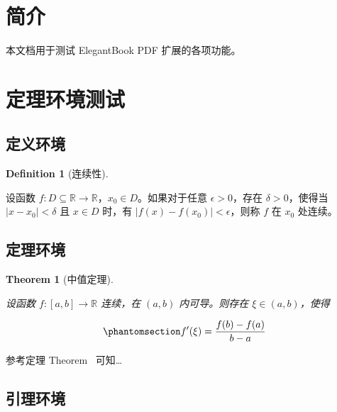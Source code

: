 \documentclass[
  11pt,
  letterpaper,
  oneside,
  a4paper]{book}
\numberwithin{equation}{chapter}
\let\quartoOldRef\ref
\renewcommand{\ref}[1]{%
    \IfBeginWith{#1}{eq-}{%
      \textup{(\quartoOldRef{#1})}%
    }{%
      \quartoOldRef{#1}%
    }%
  }%
\theoremstyle{plain}
\theoremstyle{plain}
\theoremstyle{plain}
\theoremstyle{plain}
\newtheorem{theorem}{Theorem}[chapter]
\theoremstyle{definition}
\newtheorem{definition}{Definition}[chapter]
\theoremstyle{remark}
\begin{document}
\section{简介}\label{ux7b80ux4ecb}

本文档用于测试 ElegantBook PDF 扩展的各项功能。

\section{定理环境测试}\label{ux5b9aux7406ux73afux5883ux6d4bux8bd5}

\subsection{定义环境}\label{ux5b9aux4e49ux73afux5883}

\begin{definition}[连续性]\protect\hypertarget{def-continuous}{}\label{def-continuous}

设函数
\(f: D \subseteq \mathbb{R} \to \mathbb{R}\)，\(x_0 \in D\)。如果对于任意
\(\epsilon > 0\)，存在 \(\delta > 0\)，使得当 \(|x - x_0| < \delta\) 且
\(x \in D\) 时，有 \(|f(x) - f(x_0)| < \epsilon\)，则称 \(f\) 在 \(x_0\)
处连续。

\end{definition}

\subsection{定理环境}\label{ux5b9aux7406ux73afux5883}

\begin{theorem}[中值定理]\protect\hypertarget{thm-mvt}{}\label{thm-mvt}

设函数 \(f: [a,b] \to \mathbb{R}\) 连续，在 \((a,b)\) 内可导。则存在
\(\xi \in (a,b)\)，使得

\begin{equation}\protect\phantomsection\label{eq-einstein}{
f'(\xi) = \frac{f(b) - f(a)}{b - a}
}\end{equation}

\end{theorem}

参考定理 Theorem~\ref{thm-mvt} 可知\ldots{}

\subsection{引理环境}\label{ux5f15ux7406ux73afux5883}
\end{document}
